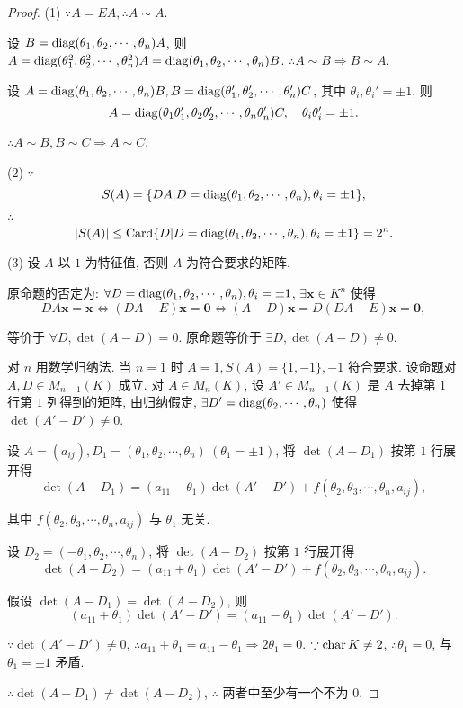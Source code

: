 \documentclass[color=black,device=normal,lang=cn,mode=geye]{elegantnote}
\begin{document}
\begin{proof}
    (1) $\because A=EA,\therefore A\sim A$.

    设 $B=\operatorname{diag}(\theta_1,\theta_2,\cdots,\theta_n)A$, 则 $A=\operatorname{diag}(\theta_1^2,\theta_2^2,\cdots,\theta_n^2)A=\operatorname{diag}(\theta_1,\theta_2,\cdots,\theta_n)B$. $\therefore A\sim B\Rightarrow B\sim A$.

    设 $A=\operatorname{diag} (\theta_1,\theta_2,\cdots,\theta_n)B,B=\operatorname{diag} (\theta_1',\theta_2',\cdots,\theta_n')C$, 其中 $\theta_i,\theta_i'=\pm1$, 则 
    \[A=\operatorname{diag} (\theta_1\theta_1',\theta_2\theta_2',\cdots,\theta_n\theta_n')C,\quad\theta_i\theta_i'=\pm1.\]
    
    $\therefore A\sim B,B\sim C\Rightarrow A\sim C$.

    (2) $\because$
    \[S(A)=\{DA|D=\operatorname{diag} (\theta_1,\theta_2,\cdots,\theta_n),\theta_i=\pm1\},\]

    $\therefore$
    \[|S(A)|\leq\operatorname{Card}\{D|D=\operatorname{diag}(\theta_1,\theta_2,\cdots,\theta_n),\theta_i=\pm1\}=2^n.\]

    (3) 设 $A$ 以 $1$ 为特征值, 否则 $A$ 为符合要求的矩阵.
    
    原命题的否定为: $\forall D=\operatorname{diag}(\theta_1,\theta_2,\cdots,\theta_n),\theta_i=\pm1$, $\exists\boldsymbol{x}\in K^n$ 使得
    \[DA\boldsymbol{x}=\boldsymbol{x}\Leftrightarrow(DA-E)\boldsymbol{x}=\boldsymbol{0}\Leftrightarrow(A-D)\boldsymbol{x}=D(DA-E)\boldsymbol{x}=\boldsymbol{0},\]

    等价于 $\forall D,\det(A-D)=0$. 原命题等价于 $\exists D,\det(A-D)\neq0$.
    
    对 $n$ 用数学归纳法. 当 $n=1$ 时 $A=1,S(A)=\{1,-1\},-1$ 符合要求. 设命题对 $A,D\in M_{n-1}(K)$ 成立. 对 $A\in M_n(K)$, 设 $A'\in M_{n-1}(K)$ 是 $A$ 去掉第 $1$ 行第 $1$ 列得到的矩阵, 由归纳假定, $\exists D'=\operatorname{diag}(\theta_2,\cdots,\theta_n)$ 使得 $\det(A'-D')\neq0$.
    
    设 $A=(a_{ij}),D_1=(\theta_1,\theta_2,\cdots,\theta_n)\ (\theta_1=\pm1)$, 将 $\det(A-D_1)$ 按第 $1$ 行展开得
    \[\det(A-D_1)=(a_{11}-\theta_1)\det(A'-D')+f(\theta_2,\theta_3,\cdots,\theta_n,a_{ij}),\]

    其中 $f(\theta_2,\theta_3,\cdots,\theta_n,a_{ij})$ 与 $\theta_1$ 无关.

    设 $D_2=(-\theta_1,\theta_2,\cdots,\theta_n)$, 将 $\det(A-D_2)$ 按第 $1$ 行展开得
    \[\det(A-D_2)=(a_{11}+\theta_1)\det(A'-D')+f(\theta_2,\theta_3,\cdots,\theta_n,a_{ij}).\]
    
    假设 $\det(A-D_1)=\det(A-D_2)$, 则
    \[(a_{11}+\theta_1)\det(A'-D')=(a_{11}-\theta_1)\det(A'-D').\]

    $\because\det(A'-D')\neq0$, $\therefore a_{11}+\theta_1=a_{11}-\theta_1\Rightarrow2\theta_1=0$. $\because\operatorname{char} K\neq2$, $\therefore\theta_1=0$, 与 $\theta_1=\pm1$ 矛盾.
    
    $\therefore\det(A-D_1)\neq\det(A-D_2)$, $\therefore$ 两者中至少有一个不为 $0$.
\end{proof}
\end{document}
